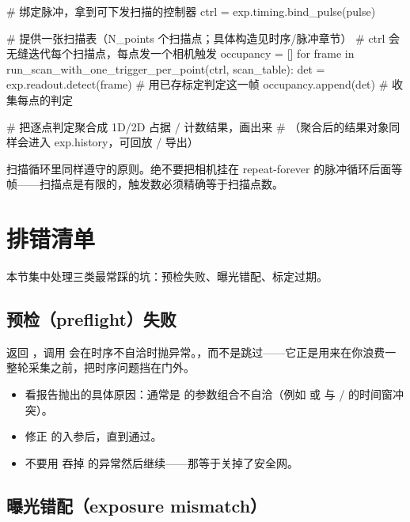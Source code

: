 \documentclass[11pt,oneside,openany]{book}
\begin{document}
\begin{codeblock}[Python]
# 绑定脉冲，拿到可下发扫描的控制器
ctrl = exp.timing.bind_pulse(pulse)

# 提供一张扫描表（N_points 个扫描点；具体构造见时序/脉冲章节）
# ctrl 会无缝迭代每个扫描点，每点发一个相机触发
occupancy = []
for frame in run_scan_with_one_trigger_per_point(ctrl, scan_table):
    det = exp.readout.detect(frame)   # 用已存标定判定这一帧
    occupancy.append(det)             # 收集每点的判定

# 把逐点判定聚合成 1D/2D 占据 / 计数结果，画出来
# （聚合后的结果对象同样会进入 exp.history，可回放 / 导出）
\end{codeblock}

\begin{notebox}[别让相机干等]
扫描循环里同样遵守的原则。绝不要把相机挂在 repeat-forever 的脉冲循环后面等帧——扫描点是有限的，触发数必须精确等于扫描点数。
\end{notebox}

\section{排错清单}

本节集中处理三类最常踩的坑：预检失败、曝光错配、标定过期。

\subsection{预检（preflight）失败}

 返回 ，调用  会在时序不自洽时抛异常。，而不是跳过——它正是用来在你浪费一整轮采集之前，把时序问题挡在门外。

\begin{itemize}
\item 看报告抛出的具体原因：通常是  的参数组合不自洽（例如  或  与 / 的时间窗冲突）。
\item 修正  的入参后，直到通过。
\item 不要用  吞掉  的异常然后继续——那等于关掉了安全网。
\end{itemize}

\subsection{曝光错配（exposure mismatch）}
\end{document}
